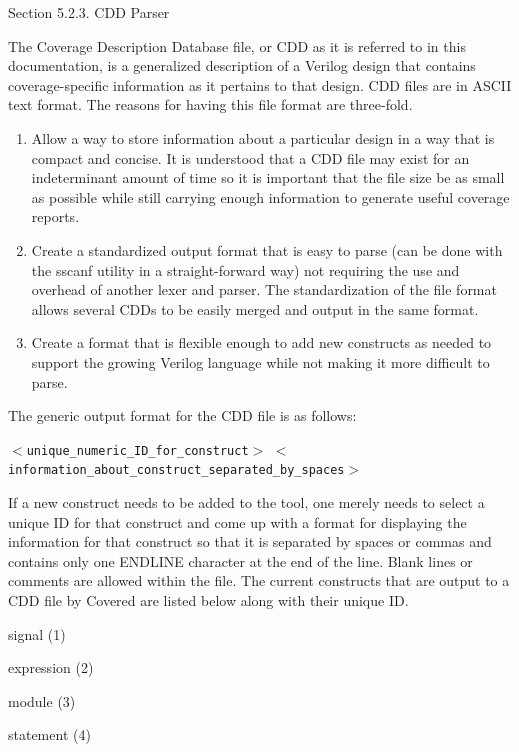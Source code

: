 \begin{Desc}
\item[Section 5.2.3.  CDD Parser]\par
 The Coverage Description Database file, or CDD as it is referred to in this documentation, is a generalized description of a Verilog design that contains coverage-specific information as it pertains to that design. CDD files are in ASCII text format. The reasons for having this file format are three-fold.

\begin{enumerate}
\item 
Allow a way to store information about a particular design in a way that is compact and concise. It is understood that a CDD file may exist for an indeterminant amount of time so it is important that the file size be as small as possible while still carrying enough information to generate useful coverage reports.\item 
Create a standardized output format that is easy to parse (can be done with the sscanf utility in a straight-forward way) not requiring the use and overhead of another lexer  and parser. The standardization of the file format allows several CDDs to be easily merged and output in the same format.\item 
Create a format that is flexible enough to add new constructs as needed to support the growing Verilog language while not making it more difficult to parse.\end{enumerate}
\end{Desc}


 The generic output format for the CDD file is as follows:

 {\tt $<$unique\_\-numeric\_\-ID\_\-for\_\-construct$>$} {\tt $<$information\_\-about\_\-construct\_\-separated\_\-by\_\-spaces$>$}

 If a new construct needs to be added to the tool, one merely needs to select a unique ID for that construct and come up with a format for displaying the information for that construct so that it is separated by spaces or commas and contains only one ENDLINE character at the end of the line. Blank lines or comments are allowed within the file. The current constructs that are output to a CDD file by Covered are listed below along with their unique ID.

\begin{CompactItemize}
\item 
signal (1)\item 
expression (2)\item 
module (3)\item 
statement (4)\end{CompactItemize}


